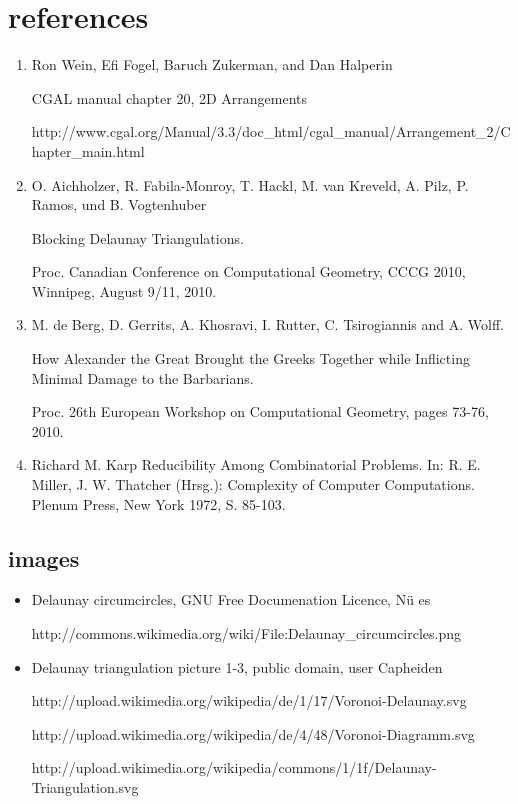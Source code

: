 \documentclass[a4paper,12pt]{article}
\begin{document}
\section{references}
\small
\begin{enumerate}
\item
\label{ref:cgal}
Ron Wein, Efi Fogel, Baruch Zukerman, and Dan Halperin

CGAL manual chapter 20, 2D Arrangements

http://www.cgal.org/Manual/3.3/doc\_html/cgal\_manual/Arrangement\_2/Chapter\_main.html

\item
\label{ref:blocking}
O. Aichholzer, R. Fabila-Monroy, T. Hackl, M. van Kreveld, A. Pilz, P. Ramos, und B. Vogtenhuber

Blocking Delaunay Triangulations. 

Proc. Canadian Conference on Computational Geometry, CCCG 2010, Winnipeg, August 9/11, 2010. 


\item
\label{ref:alexander}
M. de Berg, D. Gerrits, A. Khosravi, I. Rutter, C. Tsirogiannis and A. Wolff.

How Alexander the Great Brought the Greeks Together while Inflicting Minimal Damage to the Barbarians.

Proc. 26th European Workshop on Computational Geometry, pages 73-76, 2010.

\item
\label{ref:karp}
Richard M. Karp
Reducibility Among Combinatorial Problems.
In: R. E. Miller, J. W. Thatcher (Hrsg.): Complexity of Computer Computations. Plenum Press, New York 1972, S. 85-103.

\end{enumerate}


\subsection{images}
\begin{itemize}
\item
Delaunay circumcircles, GNU Free Documenation Licence, N\"u es

http://commons.wikimedia.org/wiki/File:Delaunay\_circumcircles.png

\item
Delaunay triangulation picture 1-3, public domain, user Capheiden 

http://upload.wikimedia.org/wikipedia/de/1/17/Voronoi-Delaunay.svg

http://upload.wikimedia.org/wikipedia/de/4/48/Voronoi-Diagramm.svg

http://upload.wikimedia.org/wikipedia/commons/1/1f/Delaunay-Triangulation.svg

\end{itemize}
\end{document}
